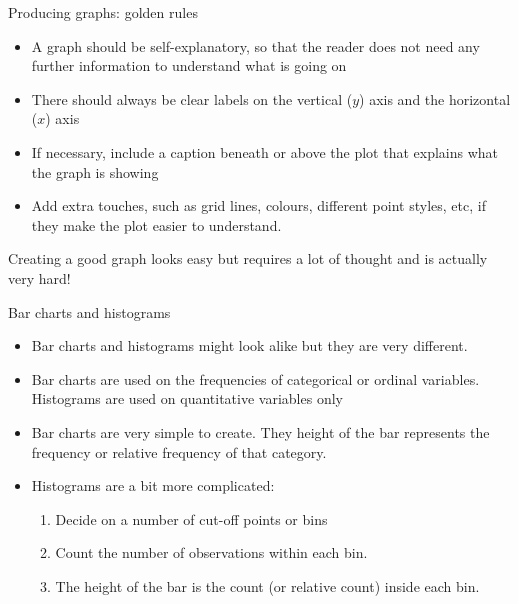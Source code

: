\documentclass[12pt,xcolor=dvipsnames,handout,mathserif,aspectratio=169]{beamer}
\begin{document}
\begin{frame}{ Producing graphs: golden rules }

\begin{itemize}
\item A graph should be self-explanatory, so that the reader does not need any further information to understand what is going on
\pause
\item There should always be clear labels on the vertical ($y$) axis and the horizontal ($x$) axis
\pause
\item If necessary, include a caption beneath or above the plot that explains what the graph is showing
\pause
\item Add extra touches, such as grid lines, colours, different point styles, etc, if they make the plot easier to understand.
\end{itemize}
\pause
Creating a good graph looks easy but requires a lot of thought and is actually very hard!
\end{frame}

\begin{frame}{ Bar charts and histograms  }

\begin{itemize}
\item Bar charts and histograms might look alike but they are very different. 
\pause
\item Bar charts are used on the frequencies of categorical or ordinal variables. Histograms are used on quantitative variables only 
\pause
\item Bar charts are very simple to create. They height of the bar represents the frequency or relative frequency of that category.\\
\pause
\item Histograms are a bit more complicated:
\begin{enumerate}
\item Decide on a number of cut-off points or bins
\item Count the number of observations within each bin. 
\item The height of the bar is the count (or relative count) inside each bin.
\end{enumerate}
\end{itemize}
\end{frame}
\end{document}
